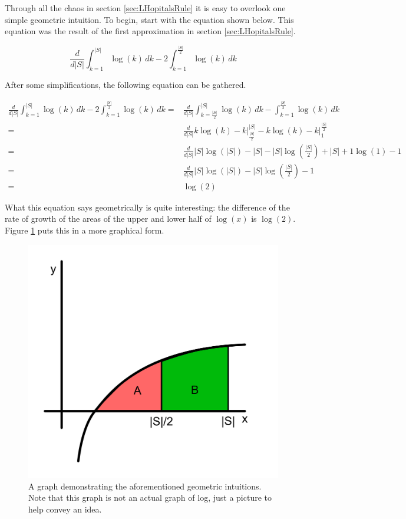 \documentclass{article}
\begin{document}
Through all the chaos in section \ref{sec:LHopitalsRule} it is easy to overlook one simple geometric intuition. To begin, start with the equation shown below. This equation was the result of the first approximation in section \ref{sec:LHopitalsRule}.

\begin{equation*}
	\frac{d}{d|S|}
	\int_{k=1}^{|S|}\log(k)\,dk-2\int_{k=1}^{\frac{|S|}{2}}\log(k)\,dk
\end{equation*}

After some simplifications, the following equation can be gathered.

\begin{equation*}
	\begin{split}
		\frac{d}{d|S|}
		\int_{k=1}^{|S|}\log(k)\,dk-2\int_{k=1}^{\frac{|S|}{2}}\log(k)\,dk
		= &
		\frac{d}{d|S|}
		\int_{k=\frac{|S|}{2}}^{|S|}\log(k)\,dk-\int_{k=1}^{\frac{|S|}{2}}\log(k)\,dk
		\\
		= &
		\frac{d}{d|S|}
		k\log(k)-k \Big|_{\frac{|S|}{2}}^{|S|}-
		k\log(k)-k \Big|_{1}^{\frac{|S|}{2}}
		\\
		= &
		\frac{d}{d|S|}
		|S|\log(|S|)-|S|
		-|S|\log\left(\frac{|S|}{2}\right)+|S|
		+1\log(1)-1
		\\
		= &
		\frac{d}{d|S|}
		|S|\log(|S|)
		-|S|\log\left( \frac{|S|}{2} \right)
		-1
		\\
		= &
		\log(2)
	\end{split}
\end{equation*}

What this equation says geometrically is quite interesting: the difference of the rate of growth of the areas of the upper and lower half of $\log(x)$ is $\log(2)$. Figure \ref{fig:LogArea} puts this in a more graphical form.

\begin{figure}[h]
    \center
    \includegraphics[scale=0.4]{img/LogArea.png}
    \caption{A graph demonstrating the aforementioned geometric intuitions. Note that this graph is not an actual graph of log, just a picture to help convey an idea.}
    \label{fig:LogArea}
\end{figure}
\end{document}
